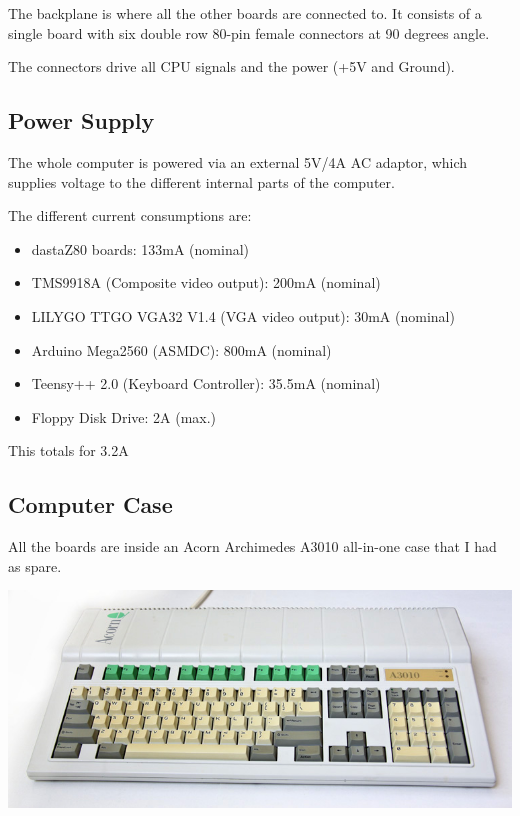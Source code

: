 \documentclass[a4paper,11pt]{article}
\begin{document}
    The backplane is where all the other boards are connected to. It consists
    of a single board with six double row 80-pin female connectors at 90 degrees
    angle.

    The connectors drive all CPU signals and the power (+5V and Ground).

    \subsection{Power Supply}

    The whole computer is powered via an external 5V/4A AC adaptor, which
    supplies voltage to the different internal parts of the computer.

    The different current consumptions are:

    \begin{itemize}
        \item dastaZ80 boards: 133mA (nominal)
        \item TMS9918A (Composite video output): 200mA (nominal)
        \item LILYGO TTGO VGA32 V1.4 (VGA video output): 30mA (nominal)
        \item Arduino Mega2560 (ASMDC): 800mA (nominal)
        \item Teensy++ 2.0 (Keyboard Controller): 35.5mA (nominal)
        \item Floppy Disk Drive: 2A (max.)
    \end{itemize}

    This totals for 3.2A

    \subsection{Computer Case}

    All the boards are inside an Acorn Archimedes A3010 all-in-one case that I
    had as spare.

    \begin{center}
        \includegraphics{acorn3010top.jpg}
    \end{center}
\end{document}

